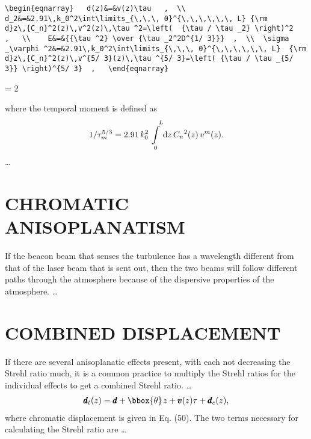 \begin{verbatim}
\begin{eqnarray}   d(z)&=&v(z)\tau   ,  \\
d_2&=&2.91\,k_0^2\int\limits_{\,\,\, 0}^{\,\,\,\,\,\, L} {\rm
d}z\,{C_n}^2(z)\,v^2(z)\,\tau ^2=\left(  {\tau / \tau _2} \right)^2
,   \\    E&=&{{\tau ^2} \over {\tau _2^2D^{1/ 3}}}  ,  \\  \sigma
_\varphi ^2&=&2.91\,k_0^2\int\limits_{\,\,\, 0}^{\,\,\,\,\,\, L}  {\rm
d}z\,{C_n}^2(z)\,v^{5/ 3}(z)\,\tau ^{5/ 3}=\left( {\tau / \tau _{5/
3}} \right)^{5/ 3}  ,   \end{eqnarray}

\end{verbatim}
\newpage
\baselineskip = 2\baselineskip  %


where the temporal moment is
defined as  \begin{eqnarray}  1/ \tau _m^{5/
3}=2.91\,k_0^2\int\limits_{\,\,\, 0}^{\,\,\,\,\,\, L}  {\rm
d}z\,{C_n}^2(z)\,v^m(z)  .   \end{eqnarray}
\ldots

\section{ CHROMATIC ANISOPLANATISM}
\label{ca}
If the beacon beam that senses the  turbulence has a wavelength
different from that of the laser beam that  is sent out, then the
two beams will follow different paths through the  atmosphere
because of the dispersive properties of the atmosphere. \ldots

\section{ COMBINED DISPLACEMENT}
\label{cd}
If there are several anisoplanatic  effects present, with each not
decreasing the Strehl ratio much, it is a  common practice to
multiply the Strehl ratios for the individual effects  to get a
combined Strehl ratio. \ldots
\begin{eqnarray}
{\rm \pmb{d}}_t(z)={\rm  \pmb{d}}+{ \rm \bbox{
\theta}} \kern 1ptz+{\rm \pmb{v}}(z)\tau +{\rm  \pmb{d}}_c(z)  ,
\end{eqnarray} where chromatic displacement is given in Eq. (50).
The two terms  necessary for calculating the Strehl ratio are
\ldots

